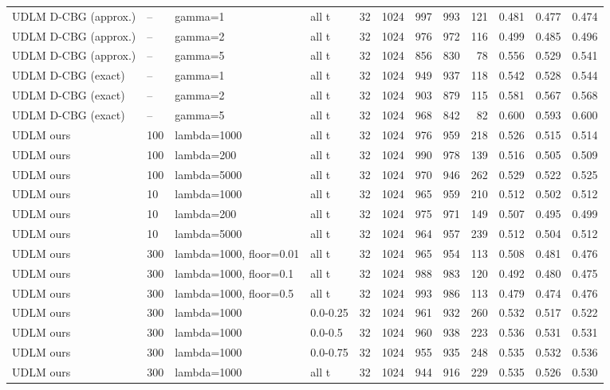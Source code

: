 \begin{tabular}{lllllrrrrrrr}
UDLM D-CBG (approx.) & -- & gamma=1 & all t & 32 & 1024 & 997 & 993 & 121 & 0.481 & 0.477 & 0.474 \\
UDLM D-CBG (approx.) & -- & gamma=2 & all t & 32 & 1024 & 976 & 972 & 116 & 0.499 & 0.485 & 0.496 \\
UDLM D-CBG (approx.) & -- & gamma=5 & all t & 32 & 1024 & 856 & 830 & 78 & 0.556 & 0.529 & 0.541 \\
UDLM D-CBG (exact) & -- & gamma=1 & all t & 32 & 1024 & 949 & 937 & 118 & 0.542 & 0.528 & 0.544 \\
UDLM D-CBG (exact) & -- & gamma=2 & all t & 32 & 1024 & 903 & 879 & 115 & 0.581 & 0.567 & 0.568 \\
UDLM D-CBG (exact) & -- & gamma=5 & all t & 32 & 1024 & 968 & 842 & 82 & 0.600 & 0.593 & 0.600 \\
UDLM ours & 100 & lambda=1000 & all t & 32 & 1024 & 976 & 959 & 218 & 0.526 & 0.515 & 0.514 \\
UDLM ours & 100 & lambda=200 & all t & 32 & 1024 & 990 & 978 & 139 & 0.516 & 0.505 & 0.509 \\
UDLM ours & 100 & lambda=5000 & all t & 32 & 1024 & 970 & 946 & 262 & 0.529 & 0.522 & 0.525 \\
UDLM ours & 10 & lambda=1000 & all t & 32 & 1024 & 965 & 959 & 210 & 0.512 & 0.502 & 0.512 \\
UDLM ours & 10 & lambda=200 & all t & 32 & 1024 & 975 & 971 & 149 & 0.507 & 0.495 & 0.499 \\
UDLM ours & 10 & lambda=5000 & all t & 32 & 1024 & 964 & 957 & 239 & 0.512 & 0.504 & 0.512 \\
UDLM ours & 300 & lambda=1000, floor=0.01 & all t & 32 & 1024 & 965 & 954 & 113 & 0.508 & 0.481 & 0.476 \\
UDLM ours & 300 & lambda=1000, floor=0.1 & all t & 32 & 1024 & 988 & 983 & 120 & 0.492 & 0.480 & 0.475 \\
UDLM ours & 300 & lambda=1000, floor=0.5 & all t & 32 & 1024 & 993 & 986 & 113 & 0.479 & 0.474 & 0.476 \\
UDLM ours & 300 & lambda=1000 & 0.0-0.25 & 32 & 1024 & 961 & 932 & 260 & 0.532 & 0.517 & 0.522 \\
UDLM ours & 300 & lambda=1000 & 0.0-0.5 & 32 & 1024 & 960 & 938 & 223 & 0.536 & 0.531 & 0.531 \\
UDLM ours & 300 & lambda=1000 & 0.0-0.75 & 32 & 1024 & 955 & 935 & 248 & 0.535 & 0.532 & 0.536 \\
UDLM ours & 300 & lambda=1000 & all t & 32 & 1024 & 944 & 916 & 229 & 0.535 & 0.526 & 0.530 \\

\end{tabular}
